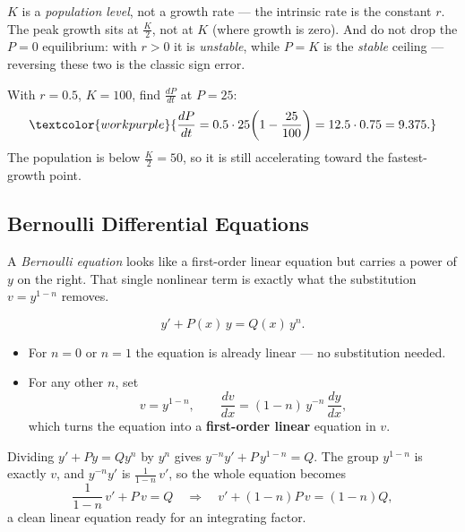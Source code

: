 \begin{warningbox}
$K$ is a \emph{population level}, not a growth rate --- the intrinsic rate is the
constant $r$. The peak growth sits at $\tfrac{K}{2}$, not at $K$ (where growth is
zero). And do not drop the $P=0$ equilibrium: with $r>0$ it is \emph{unstable},
while $P=K$ is the \emph{stable} ceiling --- reversing these two is the classic
sign error.
\end{warningbox}

\begin{examplebox}
With $r = 0.5$, $K = 100$, find $\frac{dP}{dt}$ at $P = 25$:
\[ \textcolor{workpurple}{\frac{dP}{dt} = 0.5 \cdot 25\!\left(1 - \frac{25}{100}\right) = 12.5 \cdot 0.75 = 9.375.} \]
The population is below $\tfrac{K}{2}=50$, so it is still accelerating toward the
fastest-growth point.
\end{examplebox}

\subsection{Bernoulli Differential Equations}

A \emph{Bernoulli equation} looks like a first-order linear equation but carries
a power of $y$ on the right. That single nonlinear term is exactly what the
substitution $v = y^{1-n}$ removes.

\begin{formulabox}
\[ y' + P(x)\,y = Q(x)\,y^{n}. \]
\begin{itemize}[leftmargin=1.4em, itemsep=2pt]
    \item For $n = 0$ or $n = 1$ the equation is already linear --- no
          substitution needed.
    \item For any other $n$, set
          \[ v = y^{1-n}, \qquad \frac{dv}{dx} = (1-n)\,y^{-n}\,\frac{dy}{dx}, \]
          which turns the equation into a \textbf{first-order linear} equation
          in $v$.
\end{itemize}
\end{formulabox}

\begin{methodbox}[Why $v=y^{1-n}$ Works]
Dividing $y' + P y = Q y^{n}$ by $y^{n}$ gives $y^{-n}y' + P\,y^{1-n} = Q$. The
group $y^{1-n}$ is exactly $v$, and $y^{-n}y'$ is $\frac{1}{1-n}\,v'$, so the
whole equation becomes
\[ \frac{1}{1-n}\,v' + P\,v = Q \quad\Longrightarrow\quad v' + (1-n)P\,v = (1-n)Q, \]
a clean linear equation ready for an integrating factor.
\end{methodbox}

